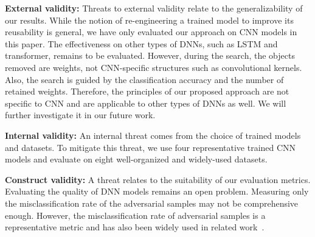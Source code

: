 \textbf{External validity:}
Threats to external validity relate to the generalizability of our results. 
While the notion of re-engineering a trained model to improve its reusability %
is general, we have only evaluated our approach on CNN models in this paper.
The effectiveness on other types of DNNs, such as LSTM and transformer, remains to be evaluated. 
However, during the search, the objects removed are weights, not CNN-specific structures such as convolutional kernels.
Also, the search is guided by the classification accuracy and the number of retained weights.
Therefore, the principles of our proposed approach are not specific to CNN and %
are applicable to other types of DNNs as well. We will further investigate it in our future work.

\textbf{Internal validity:}
An internal threat comes from the choice of trained models and datasets. To mitigate this threat, we use four representative trained CNN models and evaluate \projectName on eight well-organized and widely-used datasets.

\textbf{Construct validity:}
A threat relates to the suitability of our evaluation metrics. 
Evaluating the quality of DNN models remains an open problem.
Measuring only the misclassification rate of the adversarial samples may not be comprehensive enough. 
However, the misclassification rate of adversarial samples is a representative metric and has also been widely used in  related work~\cite{ReMos, defect2}.
